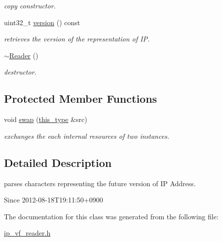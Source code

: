 \begin{DoxyCompactItemize}
\begin{DoxyCompactList}\small\item\em copy constructor. \end{DoxyCompactList}\item 
\hypertarget{classhryky_1_1ip_1_1vf_1_1_reader_a2656318ec01f84fa71260a0fa49e5ff5}{uint32\-\_\-t \hyperlink{classhryky_1_1ip_1_1vf_1_1_reader_a2656318ec01f84fa71260a0fa49e5ff5}{version} () const }\label{classhryky_1_1ip_1_1vf_1_1_reader_a2656318ec01f84fa71260a0fa49e5ff5}

\begin{DoxyCompactList}\small\item\em retrieves the version of the representation of I\-P. \end{DoxyCompactList}\item 
\hypertarget{classhryky_1_1ip_1_1vf_1_1_reader_a13e350dac66e1fd0dcb485ce1895709d}{\hyperlink{classhryky_1_1ip_1_1vf_1_1_reader_a13e350dac66e1fd0dcb485ce1895709d}{$\sim$\-Reader} ()}\label{classhryky_1_1ip_1_1vf_1_1_reader_a13e350dac66e1fd0dcb485ce1895709d}

\begin{DoxyCompactList}\small\item\em destructor. \end{DoxyCompactList}\end{DoxyCompactItemize}
\subsection*{Protected Member Functions}
\begin{DoxyCompactItemize}
\item 
\hypertarget{classhryky_1_1ip_1_1vf_1_1_reader_a98d317cff2543d6ff18784dd9d20aae2}{void \hyperlink{classhryky_1_1ip_1_1vf_1_1_reader_a98d317cff2543d6ff18784dd9d20aae2}{swap} (\hyperlink{classhryky_1_1ip_1_1vf_1_1_reader_a6a4fdf2ae2b33a48f43ae2aafaa93e12}{this\-\_\-type} \&src)}\label{classhryky_1_1ip_1_1vf_1_1_reader_a98d317cff2543d6ff18784dd9d20aae2}

\begin{DoxyCompactList}\small\item\em exchanges the each internal resources of two instances. \end{DoxyCompactList}\end{DoxyCompactItemize}


\subsection{Detailed Description}
parses characters representing the future version of I\-P Address. 

\begin{DoxySince}{Since}
2012-\/08-\/18\-T19\-:11\-:50+0900 
\end{DoxySince}


The documentation for this class was generated from the following file\-:\begin{DoxyCompactItemize}
\item 
\hyperlink{ip__vf__reader_8h}{ip\-\_\-vf\-\_\-reader.\-h}\end{DoxyCompactItemize}
